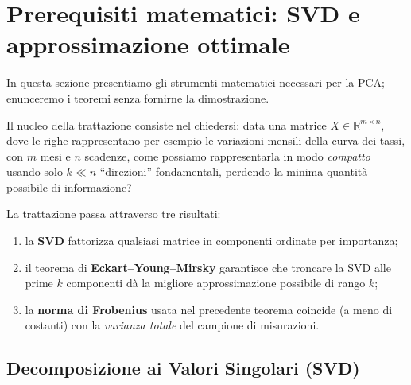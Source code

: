 \documentclass[11pt,a4paper]{article}
\theoremstyle{plain}
\theoremstyle{definition}
\theoremstyle{remark}
\begin{document}

\section{Prerequisiti matematici: SVD e approssimazione ottimale}

In questa sezione presentiamo gli strumenti matematici necessari per la PCA;
enunceremo i teoremi senza fornirne la dimostrazione.

Il nucleo della trattazione consiste nel chiedersi: data una matrice
$X \in \mathbb{R}^{m \times n}$, dove le righe rappresentano per esempio le variazioni mensili della curva dei
tassi, con $m$ mesi e $n$ scadenze, come possiamo rappresentarla in modo
\emph{compatto} usando solo $k \ll n$ ``direzioni'' fondamentali, perdendo
la minima quantità possibile di informazione?


La trattazione passa attraverso tre risultati:
\begin{enumerate}
  \item la \textbf{SVD} fattorizza qualsiasi matrice in componenti ordinate
        per importanza;
  \item il teorema di \textbf{Eckart--Young--Mirsky} garantisce che troncare
        la SVD alle prime $k$ componenti dà la migliore approssimazione
        possibile di rango $k$;
  \item la \textbf{norma di Frobenius} usata nel precedente teorema coincide
        (a meno di costanti) con la \emph{varianza totale} del campione di misurazioni.
\end{enumerate}

\medskip

\subsection{Decomposizione ai Valori Singolari (SVD)}
\end{document}
